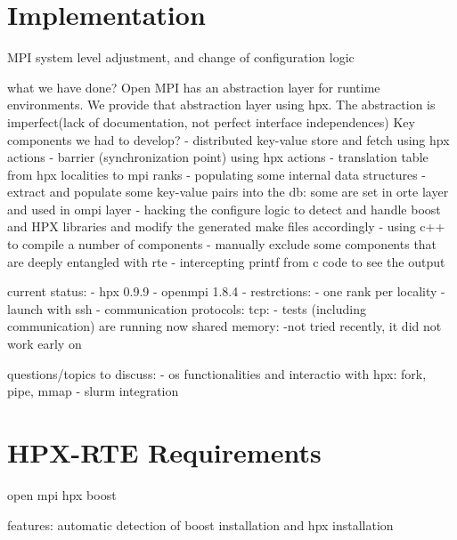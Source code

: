 \section{Implementation}
\label{sec:implementation}
MPI system level adjustment, and change of configuration logic

what we have done?
Open MPI has an abstraction layer for runtime environments.
We provide that abstraction layer using hpx.
The abstraction is imperfect(lack of documentation,
not perfect interface independences)
Key components we had to develop?
- distributed key-value store and fetch using hpx actions
- barrier (synchronization point) using hpx actions
- translation table from hpx localities to mpi ranks
- populating some internal data structures
- extract and populate some key-value pairs into the db:
some are set in orte layer and used in ompi layer
- hacking the configure logic to detect and handle boost and HPX libraries
and modify the generated make files accordingly
- using c++ to compile a number of components
- manually exclude some components that are deeply entangled with rte
- intercepting printf from c code to see the output


current status:
- hpx 0.9.9
- openmpi 1.8.4
- restrctions: - one rank per locality
- launch with ssh
- communication protocols:
tcp: - tests (including communication) are running now
shared memory: -not tried recently, it did not work early on

questions/topics to discuss:
- os functionalities and interactio with hpx: fork, pipe, mmap
- slurm integration

\fi

\section{HPX-RTE Requirements}
open mpi
hpx
boost

features:
automatic detection of boost installation and hpx installation
